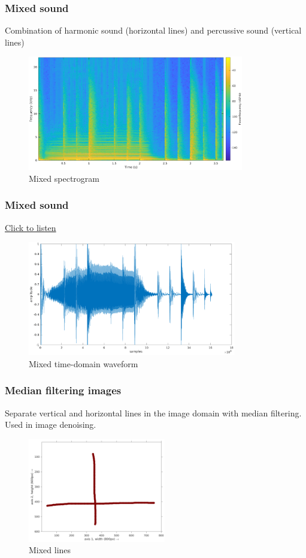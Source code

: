\documentclass{beamer}
\begin{document}
\begin{frame}
	\frametitle{Mixed sound}
	Combination of harmonic sound (horizontal lines) and percussive sound (vertical lines)\\
	\begin{figure}
	\includegraphics[height=5cm]{../images/mixedspecgram.png}
		\caption{Mixed spectrogram}
	\end{figure}
\end{frame}

\begin{frame}
	\frametitle{Mixed sound}
	\href{run:../audio/mixed.wav}{Click to listen}\\
	\begin{figure}
	\includegraphics[height=5cm]{../images/mixed_waveform.png}
		\caption{Mixed time-domain waveform}
	\end{figure}
\end{frame}

\begin{frame}
	\frametitle{Median filtering images}
	Separate vertical and horizontal lines in the image domain with median filtering. Used in image denoising.
	\begin{figure}
	\includegraphics[width=6cm]{../images/medfilter_basic_with_axes.png}
		\caption{Mixed lines}
	\end{figure}
\end{frame}
\end{document}
